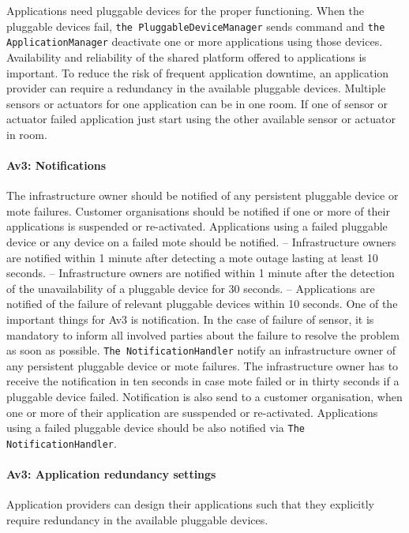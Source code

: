         Applications need pluggable devices for the proper functioning.
        When the pluggable devices fail, \texttt{the PluggableDeviceManager} sends
        command and \texttt{the ApplicationManager} deactivate one or more applications
        using those devices. Availability and reliability of the shared platform offered to applications is
        important. To reduce the risk of frequent application downtime,
        an application provider can require a redundancy in the available
        pluggable devices. Multiple sensors or actuators for one application can be in one room.
        If one of sensor or actuator failed application just start using
        the other available sensor or actuator in room.

    \paragraph{Av3: Notifications}
        The infrastructure owner should be notified of any persistent pluggable device or mote
        failures. Customer organisations should be notified if one or more of their applications is suspended
        or re-activated. Applications using a failed pluggable device or any device on a failed mote should be
        notified.
    – Infrastructure owners are notified within 1 minute after detecting a mote outage lasting at
    least 10 seconds.
    – Infrastructure owners are notified within 1 minute after the detection of the unavailability of
    a pluggable device for 30 seconds.
    – Applications are notified of the failure of relevant pluggable devices within 10 seconds.
        One of the important things for Av3 is notification. In the case
        of failure of sensor, it is mandatory to inform all involved parties
         about the failure to resolve the problem as soon as possible.
        \texttt{The NotificationHandler} notify an infrastructure owner of
        any persistent pluggable device or mote failures. The infrastructure
        owner has to receive the notification in ten seconds in case mote failed or
        in thirty seconds if a pluggable device failed. Notification is also send
        to a customer organisation, when one or more of their application are
        susspended or re-activated. Applications using a failed  pluggable
        device should be also notified via \texttt{The NotificationHandler}.

    \paragraph{Av3: Application redundancy settings}
        Application providers can design their applications such that they explicitly
        require redundancy in the available pluggable devices.

